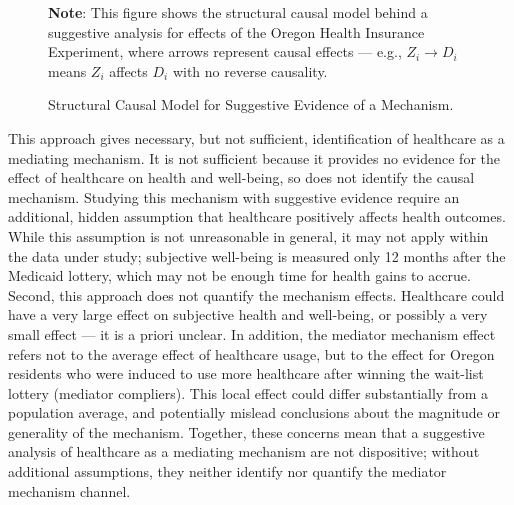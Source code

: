 \begin{figure}[!htbp]
    \centering
    \singlespacing
    \caption{Structural Causal Model for Suggestive Evidence of a Mechanism.}
    \label{fig:scm-health}
    \justify
    \footnotesize
    \textbf{Note}:
    This figure shows the structural causal model behind a suggestive analysis for effects of the Oregon Health Insurance Experiment, where arrows represent causal effects --- e.g., $Z_i \to D_i$ means $Z_i$ affects $D_i$ with no reverse causality.
\end{figure}

This approach gives necessary, but not sufficient, identification of healthcare as a mediating mechanism.
It is not sufficient because it provides no evidence for the effect of healthcare on health and well-being, so does not identify the causal mechanism.
Studying this mechanism with suggestive evidence require an additional, hidden assumption that healthcare positively affects health outcomes.
While this assumption is not unreasonable in general, it may not apply within the data under study; subjective well-being is measured only 12 months after the Medicaid lottery, which may not be enough time for health gains to accrue.
Second, this approach does not quantify the mechanism effects.
Healthcare could have a very large effect on subjective health and well-being, or possibly a very small effect --- it is a priori unclear.
In addition, the mediator mechanism effect refers not to the average effect of healthcare usage, but to the effect for Oregon residents who were induced to use more healthcare after winning the wait-list lottery (mediator compliers).
This local effect could differ substantially from a population average, and potentially mislead conclusions about the magnitude or generality of the mechanism.
Together, these concerns mean that a suggestive analysis of healthcare as a mediating mechanism are not dispositive; without additional assumptions, they neither identify nor quantify the mediator mechanism channel.


